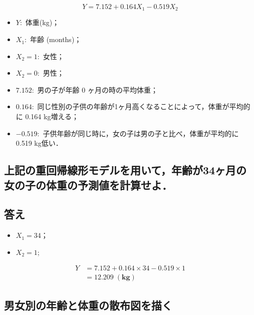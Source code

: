 \documentclass[11pt,]{problemset}
\providecommand{\tightlist}{%
  \setlength{\itemsep}{0pt}\setlength{\parskip}{0pt}}
\begin{document}
\[
Y = 7.152 + 0.164 X_1 - 0.519X_2
\]

\begin{itemize}
\tightlist
\item
  \(Y:\) 体重(kg)；
\item
  \(X_1:\) 年齢 (months)；
\item
  \(X_2 = 1:\) 女性；
\item
  \(X_2 = 0:\) 男性；
\item
  \(7.152:\) 男の子が年齢 0 ヶ月の時の平均体重；
\item
  \(0.164:\)
  同じ性別の子供の年齢が1ヶ月高くなることによって，体重が平均的に 0.164
  kg増える；
\item
  \(-0.519:\) 子供年齢が同じ時に，女の子は男の子と比べ，体重が平均的に
  0.519 kg低い．
\end{itemize}

\newpage
\vfill

\hypertarget{34}{%
\subsection{上記の重回帰線形モデルを用いて，年齢が34ヶ月の女の子の体重の予測値を計算せよ．}\label{34}}

\hypertarget{-5}{%
\subsection{答え}\label{-5}}

\begin{itemize}
\tightlist
\item
  \(X_1 = 34\)；
\item
  \(X_2 = 1\);
\end{itemize}

\[
\begin{aligned}
Y & = 7.152 + 0.164 \times 34 -0.519\times 1 \\
  & = 12.209\; \mathbf{(kg)}
\end{aligned}
\]

\bigskip\bigskip\bigskip\bigskip\bigskip\bigskip

\subsection{男女別の年齢と体重の散布図を描く}

\bigskip\bigskip\bigskip\bigskip\bigskip\bigskip
\end{document}
